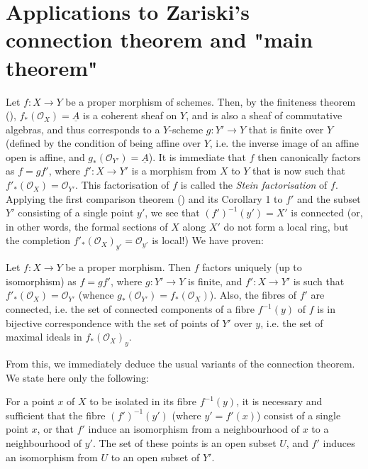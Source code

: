 \section{Applications to Zariski's connection theorem and "main theorem"}\label{fga2-4}


Let $f\colon X\to Y$ be a proper morphism of schemes.
Then, by the finiteness theorem (), $f_*(\mathcal{O}_X)=\underline{A}$ is a coherent sheaf on $Y$, and is also a sheaf of commutative algebras, and thus corresponds to a $Y$-scheme $g\colon Y'\to Y$ that is finite over $Y$ (defined by the condition of being affine over $Y$, i.e. the inverse image of an affine open is affine, and $g_*(\mathcal{O}_{Y'})=\underline{A}$).
It is immediate that $f$ then canonically factors as $f=gf'$, where $f'\colon X\to Y'$ is a morphism from $X$ to $Y$ that is now such that $f'_*(\mathcal{O}_X)=\mathcal{O}_{Y'}$.
This factorisation of $f$ is called the \emph{Stein factorisation} of $f$.
Applying the first comparison theorem () and its Corollary 1  to $f'$ and the subset $Y'$ consisting of a single point $y'$, we see that $(f')^{-1}(y')=X'$ is connected (or, in other words, the formal sections of $X$ along $X'$ do not form a local ring, but the completion $f'_*(\mathcal{O}_X)_{y'}=\mathcal{O}_{y'}$ is local!)
We have proven:

\begin{theorem}\label{fga2-theorem-5}
    Let $f\colon X\to Y$ be a proper morphism.
    Then $f$ factors uniquely (up to isomorphism) as $f=gf'$, where $g\colon Y'\to Y$ is finite, and $f'\colon X\to Y'$ is such that $f'_*(\mathcal{O}_X)=\mathcal{O}_{Y'}$ (whence $g_*(\mathcal{O}_{Y'})=f_*(\mathcal{O}_X)$).
    Also, the fibres of $f'$ are connected, i.e. the set of connected components of a fibre $f^{-1}(y)$ of $f$ is in bijective correspondence with the set of points of $Y'$ over $y$, i.e. the set of maximal ideals in $f_*(\mathcal{O}_X)_y$.
\end{theorem}

From this, we immediately deduce the usual variants of the connection theorem.
We state here only the following:

\begin{corollary}\label{fga2-theorem-5-corollary-1}
    For a point $x$ of $X$ to be isolated in its fibre $f^{-1}(y)$, it is necessary and sufficient that the fibre $(f')^{-1}(y')$ (where $y'=f'(x)$) consist of a single point $x$, or that $f'$ induce an isomorphism from a neighbourhood of $x$ to a neighbourhood of $y'$.
    The set of these points is an open subset $U$, and $f'$ induces an isomorphism from $U$ to an open subset of $Y'$.
\end{corollary}

